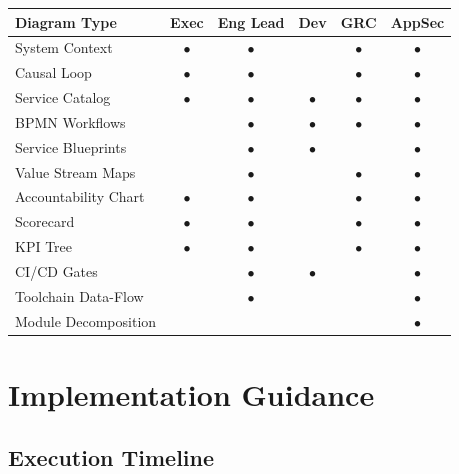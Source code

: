 \documentclass[11pt,letterpaper]{article}
\begin{document}
\begin{center}
\renewcommand{\arraystretch}{1.3}
\footnotesize
\begin{tabular}{p{4cm}ccccc}
\toprule
\textbf{Diagram Type} & \textbf{Exec} & \textbf{Eng Lead} & \textbf{Dev} & \textbf{GRC} & \textbf{AppSec} \\
\midrule
System Context & $\bullet$ & $\bullet$ & & $\bullet$ & $\bullet$ \\
Causal Loop & $\bullet$ & $\bullet$ & & $\bullet$ & $\bullet$ \\
Service Catalog & $\bullet$ & $\bullet$ & $\bullet$ & $\bullet$ & $\bullet$ \\
BPMN Workflows & & $\bullet$ & $\bullet$ & $\bullet$ & $\bullet$ \\
Service Blueprints & & $\bullet$ & $\bullet$ & & $\bullet$ \\
Value Stream Maps & & $\bullet$ & & $\bullet$ & $\bullet$ \\
Accountability Chart & $\bullet$ & $\bullet$ & & $\bullet$ & $\bullet$ \\
Scorecard & $\bullet$ & $\bullet$ & & $\bullet$ & $\bullet$ \\
KPI Tree & $\bullet$ & $\bullet$ & & $\bullet$ & $\bullet$ \\
CI/CD Gates & & $\bullet$ & $\bullet$ & & $\bullet$ \\
Toolchain Data-Flow & & $\bullet$ & & & $\bullet$ \\
Module Decomposition & & & & & $\bullet$ \\
\bottomrule
\end{tabular}
\end{center}

\newpage

\section{Implementation Guidance}

\subsection{Execution Timeline}
\end{document}
